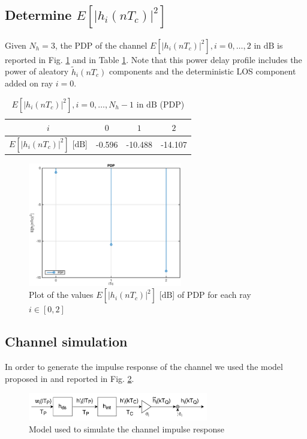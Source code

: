 \documentclass[10pt]{article}
\newcommand{\dB} {\mathrm{dB}}
\begin{document}
\subsection*{Determine $E[|h_i(nT_c)|^2]$}
Given $N_h = 3$, the PDP of the channel $E[|h_i(nT_c)|^2], i = 0, \dots, 2$ in $\dB$ is reported in Fig. \ref{fig:pdp} and in Table \ref{table:pdp}. Note that this power delay profile includes the power of aleatory $\tilde{h}_i(nT_c)$ components and the deterministic LOS component added on ray $i = 0$.

\begin{table}[h!]
  \centering
  \begin{tabular}{c|c|c|c}
    $ i $ & $ 0 $ & $ 1 $ & $ 2 $ \\ \hline
    $E[|h_i(nT_c)|^2]$ [$\dB$] & -0.596 & -10.488 & -14.107
  \end{tabular}
  \caption{$E[|h_i(nT_c)|^2], i = 0, \dots, N_h-1$ in $\dB$ (PDP)}
  \label{table:pdp}
\end{table}

\begin{figure}[h!]
  \centering
  \includegraphics[width = 0.6\textwidth]{p01_pdp}
  \caption{Plot of the values $E[|h_i(nT_c)|^2]$ [$\dB$] of PDP for each ray $ i \in [0,2]$}
  \label{fig:pdp}
\end{figure}

\subsection*{Channel simulation}
In order to generate the impulse response of the channel we used the model proposed in \cite{bc} and reported in Fig. \ref{fig:chimp}.
\begin{figure}[h!]
  \centering
  \includegraphics[width = 0.7\textwidth]{p01_channelmodel}
  \caption{Model used to simulate the channel impulse response}
  \label{fig:chimp}
\end{figure}
\end{document}
